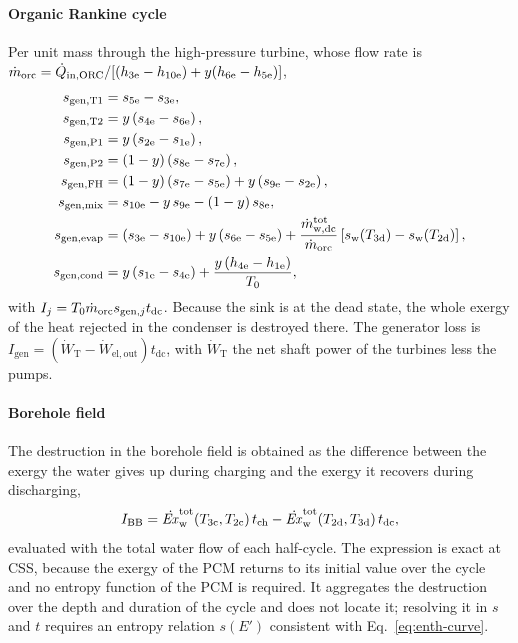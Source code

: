 \paragraph{Organic Rankine cycle} Per unit mass through the high-pressure
turbine, whose flow rate is
$\dot m_\mathrm{orc}=\dot Q_\mathrm{in,ORC}/[(h_\mathrm{3e}-h_\mathrm{10e})
+y(h_\mathrm{6e}-h_\mathrm{5e})]$,
\begin{align}
  s_{\mathrm{gen,T1}}&=s_\mathrm{5e}-s_\mathrm{3e},\notag\\
  s_{\mathrm{gen,T2}}&=y\left(s_\mathrm{4e}-s_\mathrm{6e}\right),
  \notag\\
  s_{\mathrm{gen,P1}}&=y\left(s_\mathrm{2e}-s_\mathrm{1e}\right),\notag\\
  s_{\mathrm{gen,P2}}&=\left(1-y\right)\left(s_\mathrm{8e}-s_\mathrm{7e}\right),
  \notag\\
  s_{\mathrm{gen,FH}}&=\left(1-y\right)\left(s_\mathrm{7e}-s_\mathrm{5e}\right)
     +y\left(s_\mathrm{9e}-s_\mathrm{2e}\right),\notag\\
  s_{\mathrm{gen,mix}}&=s_\mathrm{10e}-y\,s_\mathrm{9e}-\left(1-y\right)s_\mathrm{8e},
  \notag\\
  s_{\mathrm{gen,evap}}&=\left(s_\mathrm{3e}-s_\mathrm{10e}\right)
     +y\left(s_\mathrm{6e}-s_\mathrm{5e}\right)
     +\frac{\dot m_\mathrm{w,dc}^\mathrm{tot}}{\dot m_\mathrm{orc}}
      \left[s_\mathrm{w}(T_\mathrm{3d})-s_\mathrm{w}(T_\mathrm{2d})\right],\notag\\
  s_{\mathrm{gen,cond}}&=y\left(s_\mathrm{1e}-s_\mathrm{4e}\right)
     +\frac{y\left(h_\mathrm{4e}-h_\mathrm{1e}\right)}{T_0},
  \label{eq:sgen-orc}
\end{align}
with $I_j=T_0\dot m_\mathrm{orc}s_{\mathrm{gen},j}t_\mathrm{dc}$. Because the sink
is at the dead state, the whole exergy of the heat rejected in the condenser is
destroyed there. The generator loss is
$I_\mathrm{gen}=(\dot W_\mathrm{T}-\dot W_\mathrm{el,out})t_\mathrm{dc}$, with
$\dot W_\mathrm{T}$ the net shaft power of the turbines less the pumps.

\paragraph{Borehole field} The destruction in the borehole field is obtained as
the difference between the exergy the water gives up during charging and the
exergy it recovers during discharging,
\begin{equation}
  I_\mathrm{BB}=\dot{\mathit{Ex}}_\mathrm{w}^\mathrm{tot}\!\left(T_\mathrm{3c},T_\mathrm{2c}\right)t_\mathrm{ch}
   -\dot{\mathit{Ex}}_\mathrm{w}^\mathrm{tot}\!\left(T_\mathrm{2d},T_\mathrm{3d}\right)t_\mathrm{dc},
  \label{eq:I-BB}
\end{equation}
evaluated with the total water flow of each half-cycle. The expression is exact
at CSS, because the exergy of the PCM returns to its initial value over the
cycle and no entropy function of the PCM is required. It aggregates the
destruction over the depth and duration of the cycle and does not locate it;
resolving it in $s$ and $t$ requires an entropy relation $s(E')$ consistent
with Eq.~\eqref{eq:enth-curve}. 

